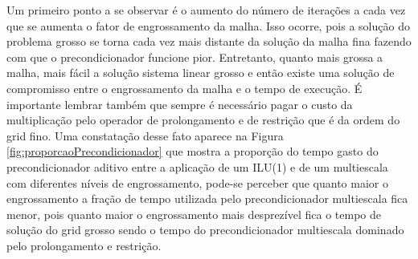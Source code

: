 \FloatBarrier

Um primeiro ponto a se observar é o aumento do número de iterações a cada vez que se aumenta o fator de engrossamento da malha. Isso ocorre, pois a solução do problema grosso se torna cada vez mais distante da solução da malha fina fazendo com que o precondicionador funcione pior. Entretanto, quanto mais grossa a malha, mais fácil a solução sistema linear grosso e então existe uma solução de compromisso entre o engrossamento da malha e o tempo de execução. É importante lembrar também que sempre é necessário pagar o custo da multiplicação pelo operador de prolongamento e de restrição que é da ordem do grid fino. Uma constatação desse fato aparece na Figura \ref{fig:proporcaoPrecondicionador} que mostra a proporção do tempo gasto do precondicionador aditivo entre a aplicação de um ILU(1) e de um multiescala com diferentes níveis de engrossamento, pode-se perceber que quanto maior o engrossamento a fração de tempo utilizada pelo precondicionador multiescala fica menor, pois quanto maior o engrossamento mais desprezível fica o tempo de solução do grid grosso sendo o tempo do precondicionador multiescala dominado pelo prolongamento e restrição.


